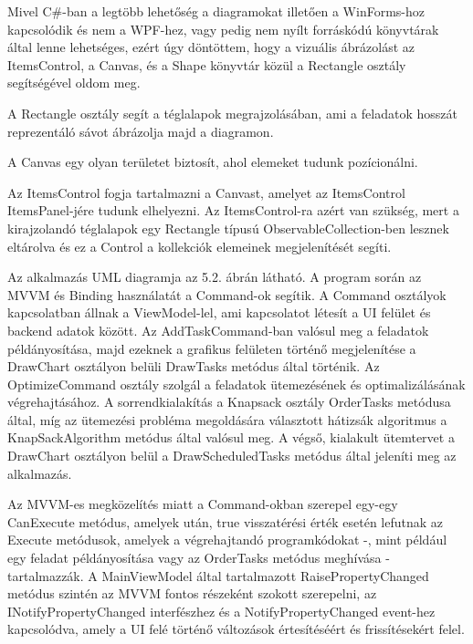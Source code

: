 
Mivel C\#-ban a legtöbb lehetőség a diagramokat illetően a WinForms-hoz kapcsolódik és nem a WPF-hez, vagy pedig nem nyílt forráskódú könyvtárak által lenne lehetséges, ezért úgy döntöttem, hogy a vizuális ábrázolást az ItemsControl, a Canvas, és a Shape könyvtár közül a Rectangle osztály segítségével oldom meg.

A Rectangle osztály segít a téglalapok megrajzolásában, ami a feladatok hosszát reprezentáló sávot ábrázolja majd a diagramon.

A Canvas egy olyan területet biztosít, ahol elemeket tudunk pozícionálni.

Az ItemsControl fogja tartalmazni a Canvast, amelyet az ItemsControl ItemsPanel-jére tudunk elhelyezni. Az ItemsControl-ra azért van szükség, mert a kirajzolandó téglalapok egy Rectangle típusú ObservableCollection-ben lesznek eltárolva és ez a Control a kollekciók elemeinek megjelenítését segíti.


Az alkalmazás UML diagramja az 5.2. ábrán látható. A program során az MVVM és Binding használatát a Command-ok segítik. A Command osztályok kapcsolatban állnak a ViewModel-lel, ami kapcsolatot létesít a UI felület és backend adatok között. Az AddTaskCommand-ban valósul meg a feladatok példányosítása, majd ezeknek a grafikus felületen történő megjelenítése a DrawChart osztályon belüli DrawTasks metódus által történik. Az OptimizeCommand osztály szolgál a feladatok ütemezésének és optimalizálásának végrehajtásához. A sorrendkialakítás a Knapsack osztály OrderTasks metódusa által, míg az ütemezési probléma megoldására választott hátizsák algoritmus a KnapSackAlgorithm metódus által valósul meg. A végső, kialakult ütemtervet a DrawChart osztályon belül a DrawScheduledTasks metódus által jeleníti meg az alkalmazás.

Az MVVM-es megközelítés miatt a Command-okban szerepel egy-egy CanExecute metódus, amelyek után, true visszatérési érték esetén lefutnak az Execute metódusok, amelyek a végrehajtandó programkódokat -, mint például egy feladat példányosítása vagy az OrderTasks metódus meghívása - tartalmazzák. A MainViewModel által tartalmazott RaisePropertyChanged metódus szintén az MVVM fontos részeként szokott szerepelni, az INotifyPropertyChanged interfészhez és a NotifyPropertyChanged event-hez kapcsolódva, amely a UI felé történő változások értesítéséért és frissítésekért felel.

